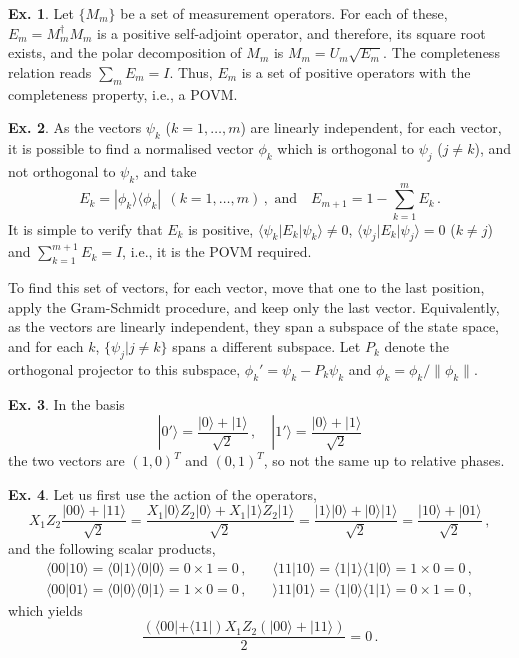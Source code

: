 \documentclass[a4paper,12pt]{article}
\theoremstyle{definition}
\newtheorem{exercise}{Ex.}[section]
\begin{document}
\begin{exercise}
 Let $\{M_m\}$ be a set of measurement operators. For each of these, $E_m=M_m^\dagger M_m$ is a positive self-adjoint operator, and therefore, its square root exists, and the polar decomposition of $M_m$ is $M_m = U_m \sqrt{E_m}$. The completeness relation reads $\sum_m E_m = I$. Thus, $E_m$ is a set of positive operators with the completeness property, i.e., a POVM.
\end{exercise}

\begin{exercise}
 As the vectors $\psi_k$ ($k=1,\dots, m$) are linearly independent, for each vector, it is possible to find a normalised vector $\phi_k$ which is orthogonal to $\psi_j$ ($j\ne k$), and not orthogonal to $\psi_k$, and take
 \[
  E_k = |\phi_k \rangle\langle \phi_k|\ \ (k=1,\dots,m)\,,\text{\ and}\quad E_{m+1} = 1-\sum_{k=1}^m E_k\,.
 \]
 It is simple to verify that $E_k$ is positive, $\langle \psi_k|E_k|\psi_k\rangle\ne 0$, $\langle \psi_j | E_k |\psi_j\rangle=0$ ($k\ne j$) and $\sum_{k=1}^{m+1} E_k = I$, i.e., it is the POVM required.
 
 To find this set of vectors, for each vector, move that one to the last position, apply the Gram-Schmidt procedure, and keep only the last vector. Equivalently, as the vectors are linearly independent, they span a subspace of the state space, and for each $k$, $\{\psi_j|j\ne k\}$ spans a different subspace. Let $P_k$ denote the orthogonal projector to this subspace, $\phi_k' = \psi_k - P_k \psi_k$ and $\phi_k = \phi_k/\|\phi_k\|$.
\end{exercise}

\begin{exercise}
 In the basis
 \[
  |0'\rangle = \frac{|0\rangle + |1\rangle}{\sqrt{2}}\,,\quad |1'\rangle = \frac{|0\rangle + |1\rangle}{\sqrt{2}}
 \]
 the two vectors are $(1, 0)^T$ and $(0, 1)^T$, so not the same up to relative phases.
\end{exercise}

\begin{exercise}
 Let us first use the action of the operators,
 \[
  X_1Z_2 \frac{|00\rangle + |11\rangle}{\sqrt{2}} = \frac{X_1 |0\rangle Z_2|0\rangle + X_1 |1\rangle Z_2|1\rangle}{\sqrt{2}} = \frac{|1\rangle |0\rangle + |0\rangle |1\rangle}{\sqrt 2}=\frac{|10\rangle + |01\rangle}{\sqrt 2}\,,
 \]
 and the following scalar products,
 \[
  \begin{aligned}
   \langle 00|10\rangle = \langle 0|1\rangle \langle 0 |0\rangle = 0\times 1 =0\,,\quad &\langle 11|10\rangle = \langle 1|1\rangle\langle 1|0\rangle = 1\times 0=0\,,\\
   \langle 00|01\rangle = \langle 0|0\rangle \langle 0| 1 \rangle = 1\times 0=0\,,\quad &\rangle 11|01\rangle = \langle 1|0\rangle \langle 1 |1\rangle = 0\times 1 =0\,,
  \end{aligned}
 \]
 which yields
 \[
  \frac{(\langle 00| + \langle 11|) X_1 Z_2 (|00\rangle + |11\rangle)}{2} = 0\,.
 \]
\end{exercise}
\end{document}
